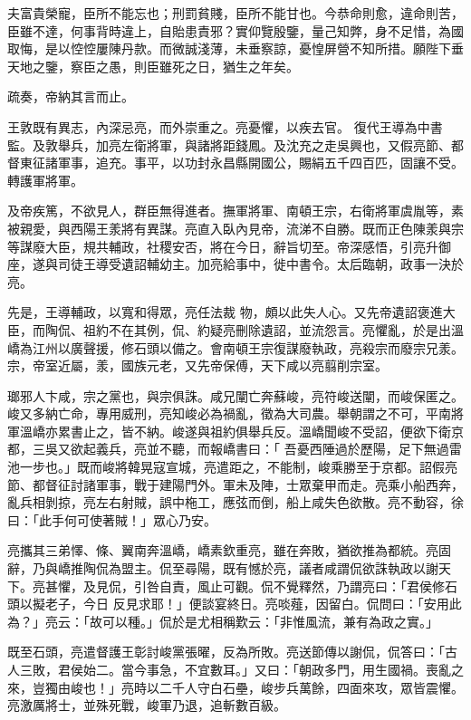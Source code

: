 \begin{pinyinscope}
 夫富貴榮寵，臣所不能忘也；刑罰貧賤，臣所不能甘也。今恭命則愈，違命則苦，臣雖不達，何事背時違上，自貽患責邪？實仰覽殷鑒，量己知弊，身不足惜，為國取悔，是以悾悾屢陳丹款。而微誠淺薄，未垂察諒，憂惶屏營不知所措。願陛下垂天地之鑒，察臣之愚，則臣雖死之日，猶生之年矣。



 疏奏，帝納其言而止。



 王敦既有異志，內深忌亮，而外崇重之。亮憂懼，以疾去官。
 復代王導為中書監。及敦舉兵，加亮左衛將軍，與諸將距錢鳳。及沈充之走吳興也，又假亮節、都督東征諸軍事，追充。事平，以功封永昌縣開國公，賜絹五千四百匹，固讓不受。轉護軍將軍。



 及帝疾篤，不欲見人，群臣無得進者。撫軍將軍、南頓王宗，右衛將軍虞胤等，素被親愛，與西陽王羕將有異謀。亮直入臥內見帝，流涕不自勝。既而正色陳羕與宗等謀廢大臣，規共輔政，社稷安否，將在今日，辭旨切至。帝深感悟，引亮升御座，遂與司徒王導受遺詔輔幼主。加亮給事中，徙中書令。太后臨朝，政事一決於亮。



 先是，王導輔政，以寬和得眾，亮任法裁
 物，頗以此失人心。又先帝遺詔褒進大臣，而陶侃、祖約不在其例，侃、約疑亮刪除遺詔，並流怨言。亮懼亂，於是出溫嶠為江州以廣聲援，修石頭以備之。會南頓王宗復謀廢執政，亮殺宗而廢宗兄羕。宗，帝室近屬，羕，國族元老，又先帝保傅，天下咸以亮翦削宗室。



 瑯邪人卞咸，宗之黨也，與宗俱誅。咸兄闡亡奔蘇峻，亮符峻送闡，而峻保匿之。峻又多納亡命，專用威刑，亮知峻必為禍亂，徵為大司農。舉朝謂之不可，平南將軍溫嶠亦累書止之，皆不納。峻遂與祖約俱舉兵反。溫嶠聞峻不受詔，便欲下衛京都，三吳又欲起義兵，亮並不聽，而報嶠書曰：「
 吾憂西陲過於歷陽，足下無過雷池一步也。」既而峻將韓晃寇宣城，亮遣距之，不能制，峻乘勝至于京都。詔假亮節、都督征討諸軍事，戰于建陽門外。軍未及陣，士眾棄甲而走。亮乘小船西奔，亂兵相剝掠，亮左右射賊，誤中柂工，應弦而倒，船上咸失色欲散。亮不動容，徐曰：「此手何可使著賊！」眾心乃安。



 亮攜其三弟懌、條、翼南奔溫嶠，嶠素欽重亮，雖在奔敗，猶欲推為都統。亮固辭，乃與嶠推陶侃為盟主。侃至尋陽，既有憾於亮，議者咸謂侃欲誅執政以謝天下。亮甚懼，及見侃，引咎自責，風止可觀。侃不覺釋然，乃謂亮曰：「君侯修石頭以擬老子，今日
 反見求耶！」便談宴終日。亮啖薤，因留白。侃問曰：「安用此為？」亮云：「故可以種。」侃於是尤相稱歎云：「非惟風流，兼有為政之實。」



 既至石頭，亮遣督護王彰討峻黨張曜，反為所敗。亮送節傳以謝侃，侃答曰：「古人三敗，君侯始二。當今事急，不宜數耳。」又曰：「朝政多門，用生國禍。喪亂之來，豈獨由峻也！」亮時以二千人守白石壘，峻步兵萬餘，四面來攻，眾皆震懼。亮激厲將士，並殊死戰，峻軍乃退，追斬數百級。




\end{pinyinscope}

